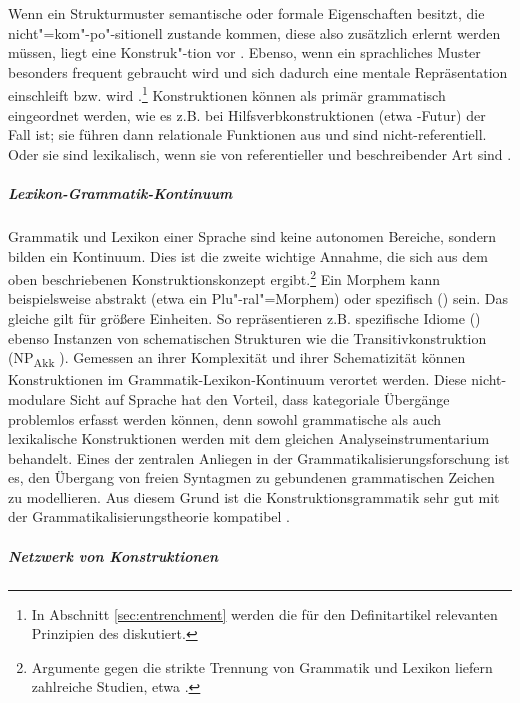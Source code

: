  
Wenn ein Strukturmuster semantische oder formale Eigenschaften besitzt, die nicht"=kom"-po"-sitionell zustande kommen, diese also zusätzlich erlernt werden müssen, liegt eine Konstruk"-tion vor \parencite{Goldberg1995}. Ebenso, wenn ein sprachliches Muster besonders frequent gebraucht wird und sich dadurch eine mentale Repräsentation einschleift bzw.  wird \parencite[93]{Goldberg2006}.\footnote{In Abschnitt \ref{sec:entrenchment} werden die für den Definitartikel relevanten Prinzipien des  diskutiert.}
Konstruktionen können als primär grammatisch eingeordnet werden, wie es z.B. bei Hilfsverbkonstruktionen (etwa -Futur) der Fall ist; sie führen dann relationale Funktionen aus und sind nicht-referentiell. Oder sie sind lexikalisch, wenn sie von referentieller und beschreibender Art sind \parencite[wie das Vollverb , vgl.][58]{Traugott2015}. 

\subparagraph{Lexikon-Grammatik-Kontinuum}

Grammatik und Lexikon einer Sprache sind keine autonomen Bereiche, sondern bilden ein Kontinuum. Dies ist die zweite wichtige Annahme, die sich aus dem oben beschriebenen  Konstruktionskonzept ergibt.\footnote{Argumente gegen die strikte Trennung von Grammatik und Lexikon liefern zahlreiche Studien, etwa \textcite{Goldberg2006}.} Ein Morphem kann beispielsweise abstrakt (etwa ein Plu"-ral"=Morphem) oder spezifisch () sein. Das gleiche gilt für größere Einheiten. So repräsentieren z.B. spezifische Idiome () ebenso Instanzen von schematischen Strukturen wie die Transitivkonstruktion  (NP\textsubscript{Akk} ). Gemessen an ihrer Komplexität und ihrer Schematizität können Konstruktionen im Grammatik-Lexikon-Kontinuum verortet werden. Diese nicht-modulare Sicht auf Sprache hat den Vorteil, dass kategoriale Übergänge problemlos erfasst werden können, denn sowohl grammatische als auch lexikalische Konstruktionen werden mit dem gleichen Analyseinstrumentarium behandelt. Eines der zentralen Anliegen in der Grammatikalisierungsforschung ist es, den Übergang von freien Syntagmen zu gebundenen grammatischen Zeichen zu modellieren. Aus diesem Grund ist die Konstruktionsgrammatik sehr gut mit der Grammatikalisierungstheorie kompatibel \parencite[zur weiterführenden Diskussion s. ][85]{Diewald2008}. 

\subparagraph*{Netzwerk von Konstruktionen}

